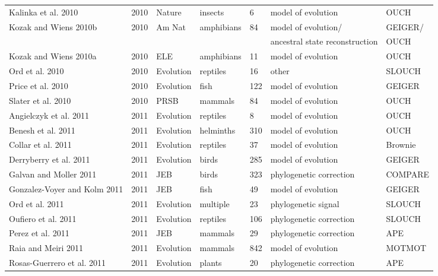 \begin{landscape}
\begin{center}
\begin{longtable}{p{6cm}llllll}
Kalinka et al. 2010   &   2010    &   Nature  &   insects &   6   &   model of evolution  &   OUCH    \\
Kozak and Wiens 2010b &   2010    &   Am Nat  &   amphibians  &   84  &   model of evolution/ &   GEIGER/ \\
    &       &       &       &       &   ancestral state reconstruction  &   OUCH    \\
Kozak and Wiens 2010a &   2010    &   ELE &   amphibians  &   11  &   model of evolution  &   OUCH    \\
Ord et al. 2010   &   2010    &   Evolution   &   reptiles    &   16  &   other   &   SLOUCH  \\
Price et al. 2010 &   2010    &   Evolution   &   fish    &   122 &   model of evolution  &   GEIGER  \\
Slater et al. 2010    &   2010    &   PRSB    &   mammals &   84  &   model of evolution  &   OUCH    \\
Angielczyk et al. 2011    &   2011    &   Evolution   &   reptiles    &   8   &   model of evolution  &   OUCH    \\
Benesh et al. 2011    &   2011    &   Evolution   &   helminths   &   310 &   model of evolution  &   OUCH    \\
Collar et al. 2011    &   2011    &   Evolution   &   reptiles    &   37  &   model of evolution  &   Brownie \\
Derryberry et al. 2011    &   2011    &   Evolution   &   birds   &   285 &   model of evolution  &   GEIGER  \\
Galvan and Moller 2011    &   2011    &   JEB &   birds   &   323 &   phylogenetic correction &   COMPARE \\
Gonzalez-Voyer and Kolm 2011  &   2011    &   JEB &   fish    &   49  &   model of evolution  &   GEIGER  \\
Ord et al. 2011   &   2011    &   Evolution   &   multiple    &   23  &   phylogenetic signal &   SLOUCH  \\
Oufiero et al. 2011   &   2011    &   Evolution   &   reptiles    &   106 &   phylogenetic correction &   SLOUCH  \\
Perez et al. 2011 &   2011    &   JEB &   mammals &   29  &   phylogenetic correction &   APE \\
Raia and Meiri 2011   &   2011    &   Evolution   &   mammals &   842 &   model of evolution  &   MOTMOT  \\
Rosas-Guerrero et al. 2011    &   2011    &   Evolution   &   plants  &   20  &   phylogenetic correction &   APE \\

\end{longtable}
\end{center}
\end{landscape}
